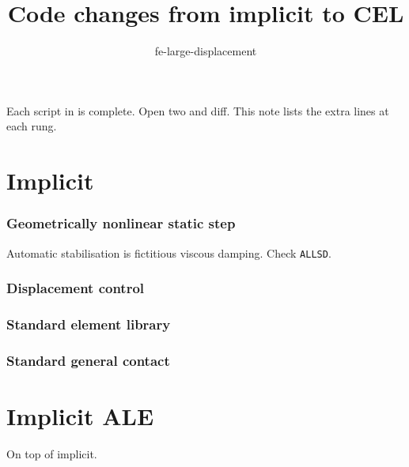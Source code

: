 \documentclass[11pt,a4paper]{article}
\title{\textbf{Code changes from implicit to CEL}}
\author{fe-large-displacement}
\date{}
\begin{document}
\maketitle
\thispagestyle{fancy}

\noindent
Each script in  is complete. Open two and diff. This note
lists the extra lines at each rung.

\section{Implicit}


\subsubsection*{Geometrically nonlinear static step}

Automatic stabilisation is fictitious viscous damping. Check \texttt{ALLSD}.



\subsubsection*{Displacement control}



\subsubsection*{Standard element library}



\subsubsection*{Standard general contact}



\section{Implicit ALE}

On top of implicit. 
\end{document}
